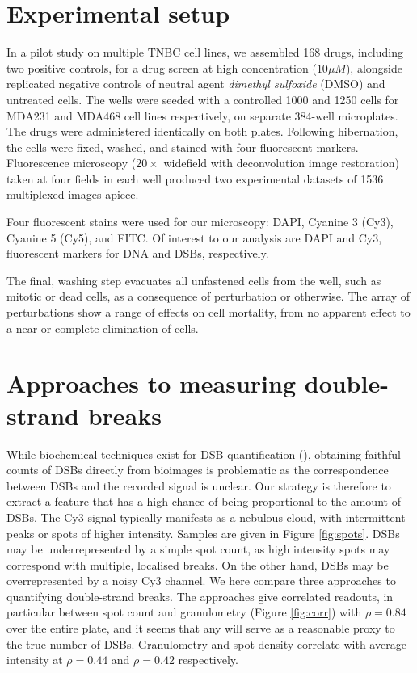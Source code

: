 \section{Experimental setup}
\label{sec:experimental}

In a pilot study on multiple TNBC cell lines, we assembled 168 drugs, including two positive controls, for a drug screen at high concentration ($10\mu M$), alongside replicated negative controls of neutral agent \emph{dimethyl sulfoxide} (DMSO) and untreated cells. The wells were seeded with a controlled 1000 and 1250 cells for MDA231 and MDA468 cell lines respectively, on separate 384-well microplates. The drugs were administered identically on both plates. Following hibernation, the cells were fixed, washed, and stained with four fluorescent markers. Fluorescence microscopy ($20\times$ widefield with deconvolution image restoration) taken at four fields in each well produced two experimental datasets of 1536 multiplexed images apiece.

Four fluorescent stains were used for our microscopy: DAPI, Cyanine 3 (Cy3), Cyanine 5 (Cy5), and FITC. Of interest to our analysis are DAPI and Cy3, fluorescent markers for DNA and DSBs, respectively.

The final, washing step evacuates all unfastened cells from the well, such as mitotic or dead cells, as a consequence of perturbation or otherwise. The array of perturbations show a range of effects on cell mortality, from no apparent effect to a near or complete elimination of cells.

\section{Approaches to measuring double-strand breaks}
\label{sec:approaches}

While biochemical techniques exist for DSB quantification (\cite{chailleux2014quantifying}), obtaining faithful counts of DSBs directly from bioimages is problematic as the correspondence between DSBs and the recorded signal is unclear. Our strategy is therefore to extract a feature that has a high chance of being proportional to the amount of DSBs. The Cy3 signal typically manifests as a nebulous cloud, with intermittent peaks or spots of higher intensity. Samples are given in Figure \ref{fig:spots}. DSBs may be underrepresented by a simple spot count, as high intensity spots may correspond with multiple, localised breaks. On the other hand, DSBs may be overrepresented by a noisy Cy3 channel. We here compare three approaches to quantifying double-strand breaks. The approaches give correlated readouts, in particular between spot count and granulometry (Figure \ref{fig:corr}) with $\rho=0.84$ over the entire plate, and it seems that any will serve as a reasonable proxy to the true number of DSBs. Granulometry and spot density correlate with average intensity at $\rho=0.44$ and $\rho=0.42$ respectively. 

